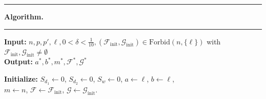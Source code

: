 \documentclass[10pt,a4paper]{amsart}
\theoremstyle{remark}
\newcommand{\Fcal}{\mathcal{F}}
\newcommand{\Gcal}{\mathcal{G}}
\begin{document}
\begin{algorithm}
\hrule
\vspace{0.11cm}

\textbf{Algorithm.}

\vspace{0.1cm}
\hrule
\BlankLine

\textbf{Input:} $n,p,p',\ell,0<\delta<\frac{1}{10},
(\Fcal_{\mathrm{init}}, \Gcal_{\mathrm{init}})\in\mathrm{Forbid}(n,\{\ell\})$
with $\Fcal_{\mathrm{init}}, \Gcal_{\mathrm{init}}\neq\emptyset$ \\
\textbf{Output:} $a^*,b^*,m^*, \Fcal^*, \Gcal^*$
\BlankLine

\textbf{Initialize:} $S_{d_1}\leftarrow 0$, $S_{d_2}\leftarrow 0$, $S_{w}\leftarrow 0$,
$a\leftarrow \ell$, $b\leftarrow \ell$, \\
\hspace{1.71cm} $m\leftarrow n$, $\Fcal\leftarrow\Fcal_{\mathrm{init}}$, $\Gcal\leftarrow\Gcal_{\mathrm{init}}$.
\BlankLine


\end{algorithm}
\end{document}
